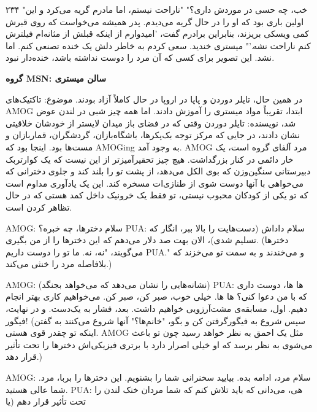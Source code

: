 ۲۳۴  
"خب، چه حسی در موردش داری؟"  
"ناراحت نیستم، اما مادرم گریه می‌کرد و این اولین باری بود که او را در حال گریه می‌دیدم. پدر همیشه می‌خواست که روی قبرش کمی ویسکی بریزند، بنابراین برادرم گفت، 'امیدوارم از اینکه قبلش از مثانه‌ام فیلترش کنم ناراحت نشه.'"  
میستری خندید. سعی کردم به خاطر دلش یک خنده تصنعی کنم. اما نشد. این تصویر برای کسی که آن مرد را دوست نداشته باشد، خنده‌دار نبود.  

\textbf{گروه MSN: سالن میستری}  

در همین حال، تایلر دوردن و پاپا در اروپا در حال کاملاً آزاد بودند.  
موضوع: تاکتیک‌های AMOG  
ابتدا، تقریباً مواد میستری را آموزش دادند. اما همه چیز شبی در لندن عوض شد،  
نویسنده: تایلر دوردن  
وقتی که در فضای باز میدان لایستر از خودشان خلاقیتی نشان دادند، در جایی که مرکز توجه بک‌پکرها، باشگاه‌بازان، گردشگران، قماربازان و مست‌ها بود. اینجا بود که AMOGing به وجود آمد.  
AMOG مرد آلفای گروه است، یک خار دائمی در کنار بزرگداشت. هیچ چیز تحقیرآمیزتر از این نیست که یک کوارتربک دبیرستانی سنگین‌وزن که بوی الکل می‌دهد، از پشت تو را بلند کند و جلوی دخترانی که می‌خواهی با آنها دوست شوی از طنازی‌ات مسخره کند.  
این یک یادآوری مداوم است که تو یکی از کودکان محبوب نیستی، تو فقط یک خرونیک داخل کمد هستی که در حال تظاهر کردن است.  

AMOG: سلام دخترها، چه خبره؟  
PUA: سلام داداش (دست‌هایت را بالا ببر، انگار که تسلیم شدی)، الان بهت صد دلار می‌دهم که این دخترها را از من بگیری.  
(دخترها می‌گویند، "نه، نه. ما تو را دوست داریم PUA." و می‌خندند و به سمت تو می‌خزند که بلافاصله مرد را خنثی می‌کند.)  

AMOG: (نشانه‌هایی را نشان می‌دهد که می‌خواهد بجنگد)  
PUA: ها ها، دوست داری که با من دعوا کنی؟ ها ها. خیلی خوب، صبر کن، صبر کن. می‌خواهیم کاری بهتر انجام دهیم.  
اول، مسابقه‌ی مشت‌آرزویی خواهیم داشت. بعد، فشار به یک‌دست. و در نهایت، فیگور!  
(سپس شروع به فیگورگرفتن کن و بگو، "خانم‌ها؟" آنها شروع می‌کنند به گفتن اینکه تو چقدر قوی هستی. AMOG مثل یک احمق به نظر خواهد رسید چون تو باعث می‌شوی به نظر برسد که او خیلی اصرار دارد با برتری فیزیکی‌اش دخترها را تحت تأثیر قرار دهد.)  

AMOG: سلام مرد، ادامه بده. بیایید سخنرانی شما را بشنویم. این دخترها را بربا، مرد. شما عالی هستید.  
PUA: هی، می‌دانی که باید تلاش کنم که شما مردان خنک لندن را تحت تأثیر قرار دهم (یا